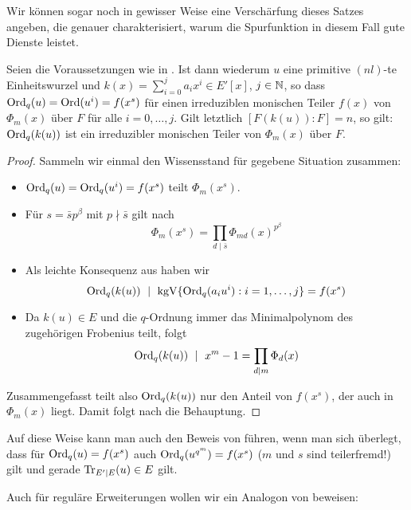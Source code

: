 Wir können sogar noch in gewisser Weise eine Verschärfung dieses Satzes
angeben, die genauer charakterisiert, warum die Spurfunktion in diesem Fall
gute Dienste leistet.

\begin{satz}
  \label{satz:q_ordnung_von_zusammensetzen}
  Seien die Voraussetzungen wie in .
  Ist dann wiederum $u$ eine primitive $(nl)$-te Einheitswurzel und
  $k(x) = \sum_{i=0}^j a_i x^i \in E'[x]$, $j\in\mathbb{N}$, so dass
  $\operatorname{Ord}_q(u) = \operatorname{Ord}(u^i) = f(x^s)$ für einen irreduziblen monischen Teiler 
  $f(x)$ von $\Phi_m(x)$ über $F$ für alle $i=0,\ldots,j$. Gilt letztlich
  $[F(k(u)):F]=n$, so gilt:
  $\operatorname{Ord}_q(k(u))$ ist ein irreduzibler monischen Teiler 
  von $\Phi_m(x)$ über $F$.
\end{satz}
\begin{proof}
  Sammeln wir einmal den Wissensstand für gegebene Situation zusammen:
  \begin{itemize}
    \item $\operatorname{Ord}_q(u) = \operatorname{Ord}_q(u^i) = f(x^s)$ teilt $\Phi_m(x^s)$.
    \item Für $s = \bar s p^\beta$ mit $p\nmid \bar s$ gilt nach
      \thref{}
      \[\Phi_m(x^s) = \prod_{d\mid \bar s} \Phi_{md}(x)^{p^\beta}\]
    \item Als leichte Konsequenz aus 
       haben wir 
      \[\operatorname{Ord}_q(k(u)) \ \mid\  \operatorname{kgV}\{\operatorname{Ord}_q(a_iu^i): i=1,\ldots,j\} = f(x^s) \]
    \item Da $k(u)\in E$ und die $q$-Ordnung immer das Minimalpolynom 
      des zugehörigen Frobenius teilt, folgt
      \[\operatorname{Ord}_q(k(u)) \ \mid\  x^m-1 = \prod_{d\mid m} \Phi_d(x)\]
  \end{itemize}
  Zusammengefasst teilt also $\operatorname{Ord}_q(k(u))$ nur den Anteil von $f(x^s)$,
  der auch in $\Phi_m(x)$ liegt. Damit folgt nach
   die Behauptung.
\end{proof}

\begin{bemerkung}
  Auf diese Weise kann man auch den Beweis von 
  führen, wenn man sich überlegt, dass für $\operatorname{Ord}_q(u) = f(x^s)$ auch
  $\operatorname{Ord}_q(u^{q^m}) = f(x^s)$ ($m$ und $s$ sind teilerfremd!) 
  gilt und gerade $\operatorname{Tr}_{E'\mid E}(u) \in E$ gilt.
\end{bemerkung}


Auch für reguläre Erweiterungen wollen wir ein Analogon von 
 beweisen:

